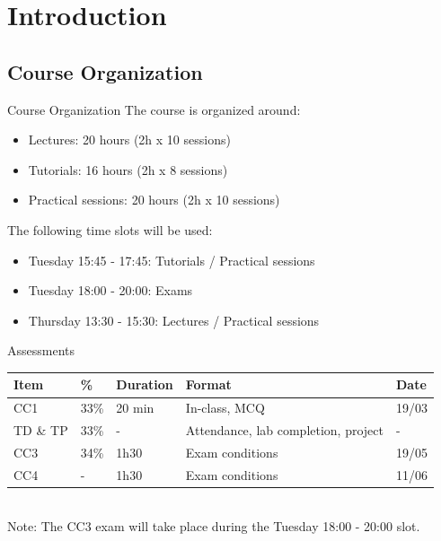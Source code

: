 \section[Introduction]{Introduction}

\subsection[Course Organization]{Course Organization}

\begin{frame}{Course Organization}
	The course is organized around:
	\begin{itemize}
		\item Lectures: 20 hours (2h x 10 sessions)
		\item Tutorials: 16 hours (2h x 8 sessions)
		\item Practical sessions: 20 hours (2h x 10 sessions)
	\end{itemize}
	\vspace{0.5cm}
	The following time slots will be used:
	\begin{itemize}
		\item Tuesday 15:45 - 17:45: Tutorials / Practical sessions
		\item Tuesday 18:00 - 20:00: Exams
		\item Thursday 13:30 - 15:30: Lectures / Practical sessions
	\end{itemize}
\end{frame}

\begin{frame}{Assessments}
	\begin{tabular}{|l|l|l|l|l|}
		\hline
		\textbf{Item} & \textbf{\%} & \textbf{Duration} & \textbf{Format} & \textbf{Date} \\
		\hline
		CC1 & 33\% & 20 min & In-class, MCQ & 19/03 \\
		\hline
		TD \& TP & 33\% & - & Attendance, lab completion, project & - \\
		\hline
		CC3 & 34\% & 1h30 & Exam conditions & 19/05 \\
		\hline
		CC4 & - & 1h30 & Exam conditions & 11/06 \\
		\hline
	\end{tabular} \\
	\vspace{0.5cm}
	Note: The CC3 exam will take place during the Tuesday 18:00 - 20:00 slot.
\end{frame}

